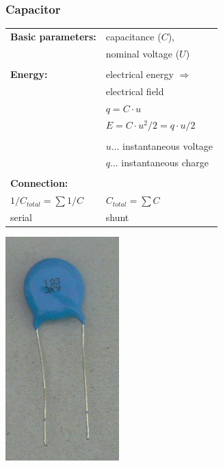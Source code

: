 \documentclass{beamer}
\begin{document}
	\begin{frame}
    \frametitle{Capacitor}
		\begin{center}
		\begin{tabular}{l l}
			\textbf{Basic parameters:} 	& capacitance ($C$),\\
																	& nominal voltage ($U$)\\ \\ \hline
			\textbf{Energy:}						& electrical energy $\Rightarrow$\\
																	& electrical field\\
																	& $q = C\cdot u$\\
																	& $E = C\cdot u^2/ 2 = q \cdot u/2$\\\\
																	& $u$... instantaneous voltage\\
																	& $q$... instantaneous charge\\\\ \hline
		  \textbf{Connection:}				& \\
			$1/C_{total}= \sum{1/C}$				& $C_{total}= \sum{C}$\\
			serial											& shunt
		\end{tabular}
		\includegraphics[scale=0.3]{obr05_kondenzator.png}
		\end{center}
  \end{frame}
\end{document}
